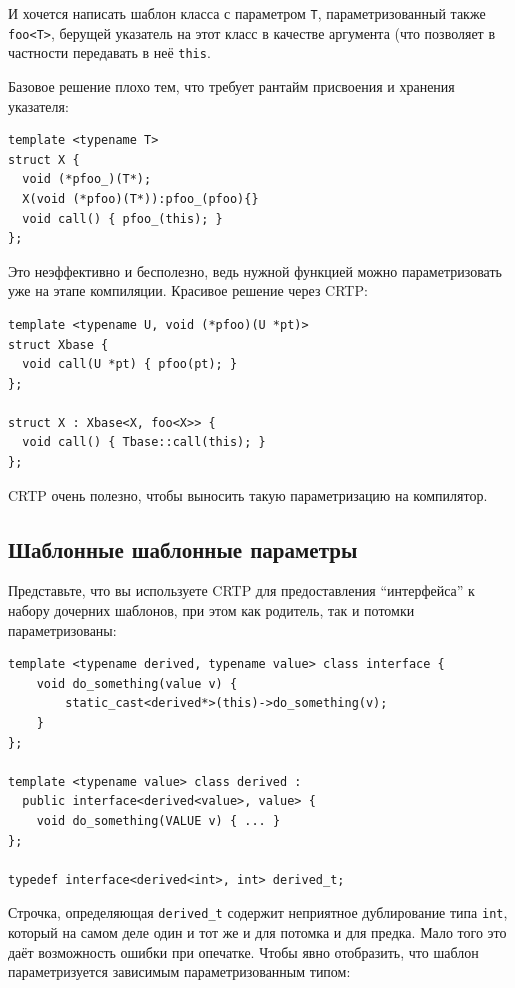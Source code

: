 \documentclass[a4paper,12pt,oneside]{book}
\begin{document}
И хочется написать шаблон класса с параметром \lstinline!T!, параметризованный также \lstinline!foo<T>!, берущей указатель на этот класс в качестве аргумента (что позволяет в частности передавать в неё \lstinline!this!.

Базовое решение плохо тем, что требует рантайм присвоения и хранения указателя:

\begin{lstlisting}
template <typename T>
struct X {
  void (*pfoo_)(T*);
  X(void (*pfoo)(T*)):pfoo_(pfoo){}
  void call() { pfoo_(this); }
};
\end{lstlisting}

Это неэффективно и бесполезно, ведь нужной функцией можно параметризовать уже на этапе компиляции. Красивое решение через CRTP:

\begin{lstlisting}
template <typename U, void (*pfoo)(U *pt)> 
struct Xbase {
  void call(U *pt) { pfoo(pt); }
};

struct X : Xbase<X, foo<X>> {
  void call() { Tbase::call(this); }
};
\end{lstlisting}

CRTP очень полезно, чтобы выносить такую параметризацию на компилятор.

\subsection{Шаблонные шаблонные параметры}\label{TemplateTemplateArguments}

Представьте, что вы используете CRTP для предоставления ``интерфейса'' к набору дочерних шаблонов, при этом как родитель, так и потомки параметризованы:

\begin{lstlisting}
template <typename derived, typename value> class interface {
    void do_something(value v) {
        static_cast<derived*>(this)->do_something(v);
    }
};

template <typename value> class derived : 
  public interface<derived<value>, value> {
    void do_something(VALUE v) { ... }
};

typedef interface<derived<int>, int> derived_t;
\end{lstlisting}

Строчка, определяющая \lstinline!derived_t! содержит неприятное дублирование типа  \lstinline!int!, который на самом деле один и тот же и для потомка и для предка. Мало того это даёт возможность ошибки при опечатке. Чтобы явно отобразить, что шаблон параметризуется зависимым параметризованным типом:
\end{document}
